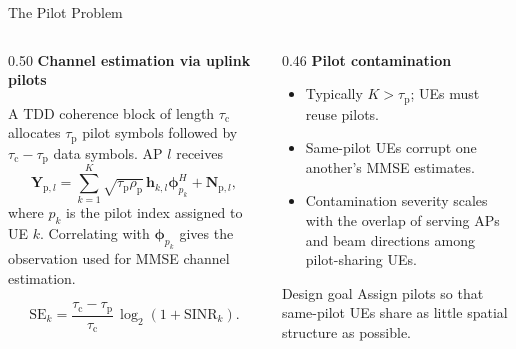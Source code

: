 \documentclass[10pt,aspectratio=169]{beamer}
\newcommand{\taup}{\tau_{\mathrm{p}}}
\newcommand{\tauc}{\tau_{\mathrm{c}}}
\newenvironment{tightitemize}{%
    \begin{itemize}
        \setlength{\itemsep}{2pt}
        \setlength{\parskip}{0pt}
        \setlength{\parsep}{0pt}
}{%
    \end{itemize}
}
\begin{document}
\begin{frame}{The Pilot Problem}
    \small
    \begin{columns}[T,onlytextwidth]
        \begin{column}{0.50\textwidth}
            \textbf{Channel estimation via uplink pilots}

            A TDD coherence block of length \(\tauc\) allocates \(\taup\) pilot symbols followed by \(\tauc-\taup\) data symbols. AP \(l\) receives
            \[
                \mathbf{Y}_{\mathrm{p},l}
                =
                \sum_{k=1}^{K}
                \sqrt{\taup\rho_{\mathrm{p}}}\,
                \mathbf{h}_{k,l}\boldsymbol{\phi}_{p_k}^{H}
                +
                \mathbf{N}_{\mathrm{p},l},
            \]
            where \(p_k\) is the pilot index assigned to UE \(k\). Correlating with \(\boldsymbol{\phi}_{p_k}\) gives the observation used for MMSE channel estimation.

            \vspace{0.4em}
            \[
                \mathrm{SE}_k = \frac{\tauc - \taup}{\tauc}\,\log_2(1+\mathrm{SINR}_k).
            \]
        \end{column}
        \begin{column}{0.46\textwidth}
            \textbf{Pilot contamination}
            \begin{tightitemize}
                \item Typically \(K>\taup\); UEs must reuse pilots.
                \item Same-pilot UEs corrupt one another's MMSE estimates.
                \item Contamination severity scales with the overlap of serving APs and beam directions among pilot-sharing UEs.
            \end{tightitemize}

            \vspace{0.45em}
            \begin{block}{Design goal}
                Assign pilots so that same-pilot UEs share as little spatial structure as possible.
            \end{block}
        \end{column}
    \end{columns}
\end{frame}
\end{document}
